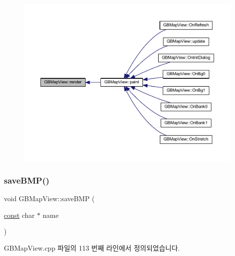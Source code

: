 \begin{figure}[H]
\begin{center}
\leavevmode
\includegraphics[width=350pt]{class_g_b_map_view_a48aeac68f689682206749e933513b98e_icgraph}
\end{center}
\end{figure}
\mbox{\label{class_g_b_map_view_a90fcc5d761fb5dfdb8f61e405831f3b5}} 
\subsubsection{\texorpdfstring{save\+B\+M\+P()}{saveBMP()}}
{\footnotesize\ttfamily void G\+B\+Map\+View\+::save\+B\+MP (\begin{DoxyParamCaption}\item[{\mbox{\hyperlink{getopt1_8c_a2c212835823e3c54a8ab6d95c652660e}{const}} char $\ast$}]{name }\end{DoxyParamCaption})}



G\+B\+Map\+View.\+cpp 파일의 113 번째 라인에서 정의되었습니다.


